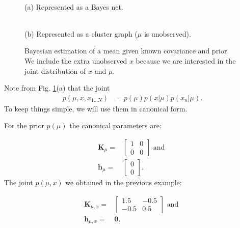 \begin{figure}[!h]
  \hfill\begin{centering}
    \parbox{0.4\textwidth}{
      \centering
         \\
      (a) Represented as a Bayes net.
    }
  \end{centering}\hfill
  \begin{centering}
    \parbox{0.4\textwidth}{ \centering
       \\
 (b) Represented as a cluster graph ($\mu$ is unobserved).
}
  \end{centering} \hfill
\caption{Bayesian estimation of a mean given known covariance and
  prior. We include the extra unobserved $x$ because we are interested
  in the joint distribution of $x$ and $\mu$.}
  \label{fig:lingaus_graphs}
\end{figure}


Note from Fig. \ref{fig:lingaus_graphs}(a) that the joint
\begin{align*}
  p(\mu,x,x_{1\ldots N}) &= p(\mu) p(x|\mu)p(x_{n}|\mu).
\end{align*}
To keep things simple, we will use them in canonical form.

For the prior $p(\mu)$ the canonical parameters are:

\begin{align*}
\bm{K}_{\mu}= & \left[\begin{array}{cc}
1 & 0\\
0 & 0
\end{array}\right]\mbox{ and }\\
\bm{h}_{\mu}= & \left[\begin{array}{c}
0\\
0
\end{array}\right].
\end{align*}
The joint $p(\mu,x)$ we obtained in the previous example:

\begin{align*}
\bm{K}_{\mu,x}= & \left[\begin{array}{cc}
1.5 & -0.5\\
-0.5 & 0.5
\end{array}\right]\mbox{ and }\\
\bm{h}_{\mu,x}= & \bm{0}.
\end{align*}

